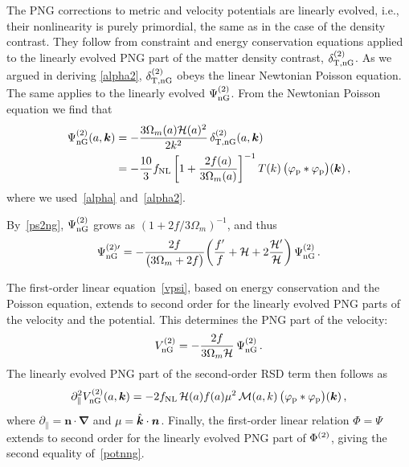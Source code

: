 {{{{The PNG corrections to metric and velocity potentials are linearly evolved, i.e., their nonlinearity is purely primordial, the same as in the case of the density contrast. They follow from  constraint and energy conservation equations applied to the linearly evolved PNG part of the matter density contrast, $\delta^{{(2)}}_{{\mathrm{T,{nG}}}}$. As we argued in deriving \eqref{alpha2}, $\delta^{{(2)}}_{{\mathrm{T,{nG}}}}$ obeys the linear Newtonian Poisson equation. The same applies to the linearly evolved $ \Psi^{{(2)}}_{{\mathrm{nG}}}$. From the Newtonian Poisson equation we find that
\begin{align}
 \Psi^{{(2)}}_{{\mathrm{nG}}}(a,\bm {k}) &= - \frac{3\Omega_m(a) \mathcal{H}(a)^2}{2 k^2}\, \delta^{{(2)}}_{{\mathrm{T,{nG}}}}(a,\bm {k}) 
 \notag\\ \label{ps2ng}
 &= - \frac{10}{3}f_\text{NL}\,\bigg[1 + \frac{2f(a)}{3\Omega_m(a)} \bigg]^{-1} \, T(k)\,\big(\varphi_{\mathrm{p}} * \varphi_{\mathrm{p}}\big)(\bm {k})\,,
\end{align}
where we used~\eqref{alpha} and~\eqref{alpha2}.

{By~\eqref{ps2ng}, $\Psi^{{(2)}}_{{\mathrm{nG}}}$ grows as $(1+2f/3\Omega_m)^{-1}$, and thus
\begin{equation} \label{p2ngp}
\Psi^{{(2)} \prime}_{{\mathrm{nG}}} = - \frac{2f}{\big(3\Omega_m+2f \big)} \bigg( \frac{f'}{f}+\mathcal{H} + 2 \frac{\mathcal{H}'}{\mathcal{H} } \bigg)
\, \Psi^{{(2)}}_{{\mathrm{nG}}}\,.
\end{equation}}

The first-order linear equation~\eqref{vpsi}, based on energy conservation and the Poisson equation, extends to second order for the linearly evolved PNG parts of the velocity and the potential. This determines the PNG part of the velocity:
\begin{equation} \label{v2ng}
V^{{(2)}}_{{\mathrm{nG}}} = - \frac{2f}{3\Omega_m\mathcal{H} }\,\Psi^{{(2)}}_{{\mathrm{nG}}}\,.
\end{equation}
The linearly evolved PNG part of the second-order RSD term then follows as
\begin{equation} \label{k2ng}
\partial_\|^2V^{{(2)}}_{{\mathrm{nG}}}(a,\bm {k}) = -2f_\text{NL}\,\mathcal{H}(a) f(a)\mu^2\, {\cal M}(a,k) \,\big(\varphi_{\mathrm{p}} * \varphi_{\mathrm{p}} \big)(\bm {k}) \,,
\end{equation}
where $\partial_{\parallel}=\bm{n}\cdot\bm{\nabla}$ and  $\mu=\hat{\bm {k}}\cdot\bm {n}$.
Finally, the first-order linear relation $\Phi=\Psi$ extends to second order for the linearly evolved PNG part of $\Phi^{{(2)}}$, giving the second equality of~\eqref{potnng}.}
%
%
%
}}}
